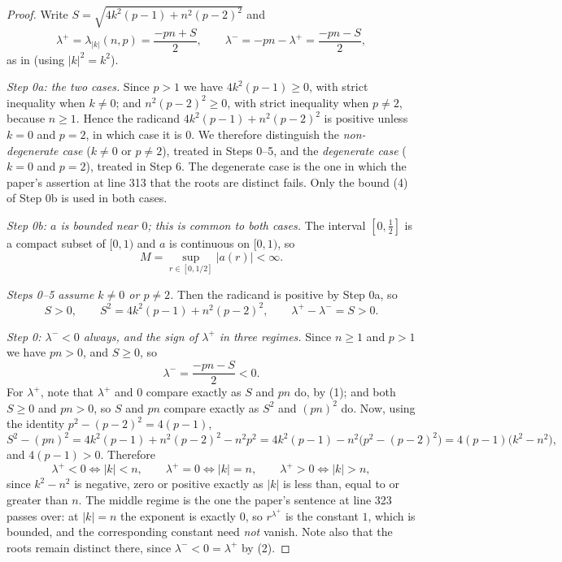 \begin{proof}
Write $S=\sqrt{4k^2(p-1)+n^2(p-2)^2}$ and
\[
  \lambda^{+}=\lambda_{|k|}(n,p)=\frac{-pn+S}{2},\qquad
  \lambda^{-}=-pn-\lambda^{+}=\frac{-pn-S}{2},
\]
as in  (using $|k|^2=k^2$).

\emph{Step 0a: the two cases.}  Since $p>1$ we have $4k^2(p-1)\ge0$, with
strict inequality when $k\neq0$; and $n^2(p-2)^2\ge0$, with strict inequality
when $p\neq2$, because $n\ge1$.  Hence the radicand
$4k^2(p-1)+n^2(p-2)^2$ is positive unless $k=0$ and $p=2$, in which case it is
$0$.  We therefore distinguish the \emph{non-degenerate case} ($k\neq0$ or
$p\neq2$), treated in Steps 0--5, and the \emph{degenerate case} ($k=0$ and
$p=2$), treated in Step 6.  The degenerate case is the one in which the paper's
assertion at line 313 that the roots are distinct fails.  Only the bound (4) of
Step 0b is used in both cases.

\emph{Step 0b: $a$ is bounded near $0$; this is common to both cases.}  The
interval $[0,\tfrac12]$ is a compact subset of $[0,1)$ and $a$ is continuous on
$[0,1)$, so
\begin{equation}\tag{4}
  M=\sup_{r\in[0,1/2]}|a(r)|<\infty .
\end{equation}

\emph{Steps 0--5 assume $k\neq0$ or $p\neq2$.}  Then the radicand is positive
by Step 0a, so
\begin{equation}\tag{1}
  S>0,\qquad S^2=4k^2(p-1)+n^2(p-2)^2,\qquad \lambda^{+}-\lambda^{-}=S>0 .
\end{equation}

\emph{Step 0: $\lambda^{-}<0$ always, and the sign of $\lambda^{+}$ in three
regimes.}  Since $n\ge1$ and $p>1$ we have $pn>0$, and $S\ge0$, so
\begin{equation}\tag{2}
  \lambda^{-}=\frac{-pn-S}{2}<0 .
\end{equation}
For $\lambda^{+}$, note that $\lambda^{+}$ and $0$ compare exactly as $S$ and
$pn$ do, by (1); and both $S\ge0$ and $pn>0$, so $S$ and $pn$ compare exactly as
$S^2$ and $(pn)^2$ do.  Now, using the identity $p^2-(p-2)^2=4(p-1)$,
\[
  S^2-(pn)^2=4k^2(p-1)+n^2(p-2)^2-n^2p^2
  =4k^2(p-1)-n^2\bigl(p^2-(p-2)^2\bigr)=4(p-1)\bigl(k^2-n^2\bigr),
\]
and $4(p-1)>0$.  Therefore
\begin{equation}\tag{3}
  \lambda^{+}<0\iff|k|<n,\qquad \lambda^{+}=0\iff|k|=n,\qquad \lambda^{+}>0\iff|k|>n,
\end{equation}
since $k^2-n^2$ is negative, zero or positive exactly as $|k|$ is less than,
equal to or greater than $n$.  The middle regime is the one the paper's
sentence at line 323 passes over: at $|k|=n$ the exponent is exactly $0$, so
$r^{\lambda^{+}}$ is the constant $1$, which is bounded, and the corresponding
constant need \emph{not} vanish.  Note also that the roots remain distinct
there, since $\lambda^{-}<0=\lambda^{+}$ by (2).


\end{proof}
